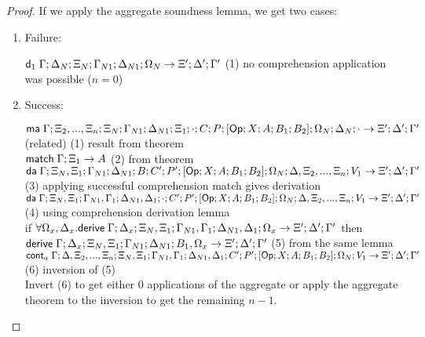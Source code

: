 \begin{proof}
   If we apply the aggregate soundness lemma, we get two cases:
   
   \begin{enumerate}
      \item Failure:
      
      $\mathsf{d}_1 \; \Gamma; \Delta_N; \Xi_N; \Gamma_{N1}; \Delta_{N1}; \Omega_N \rightarrow \Xi'; \Delta'; \Gamma'$ \hfill (1) no comprehension application was possible ($n = 0$)\\
      
      \item Success:
      
      $\mathsf{ma} \; \Gamma; \Xi_2, ..., \Xi_n; \Xi_N; \Gamma_{N1}; \Delta_{N1}; \Xi_1; \cdot; C; P; [\mathsf{Op} ; X ; A ; B_1; B_2]; \Omega_N; \Delta_N; \cdot \rightarrow \Xi'; \Delta'; \Gamma'$ (related) \hfill (1) result from theorem \\
      $\mathsf{match} \; \Gamma; \Xi_1 \rightarrow A$ \hfill (2) from theorem \\
      $\mathsf{da} \; \Gamma; \Xi_N, \Xi_1; \Gamma_{N1}; \Delta_{N1}; B; C'; P'; [\mathsf{Op} ; X ; A ; B_1; B_2]; \Omega_N; \Delta, \Xi_2, ..., \Xi_n; V_1 \rightarrow \Xi'; \Delta'; \Gamma'$ \hfill (3) applying successful comprehension match gives derivation \\
      $\mathsf{da} \; \Gamma; \Xi_N, \Xi_1; \Gamma_{N1}, \Gamma_1; \Delta_{N1}, \Delta_1; \cdot; C'; P'; [\mathsf{Op} ; X ; A ; B_1; B_2]; \Omega_N; \Delta, \Xi_2, ..., \Xi_n; V_1 \rightarrow \Xi'; \Delta'; \Gamma'$ \hfill (4) using comprehension derivation lemma \\
      if $\forall \Omega_x, \Delta_x. \mathsf{derive} \; \Gamma; \Delta_x; \Xi_N, \Xi_1; \Gamma_{N1}, \Gamma_1; \Delta_{N1}, \Delta_1; \Omega_x \rightarrow \Xi'; \Delta'; \Gamma'$ then $\mathsf{derive} \; \Gamma; \Delta_x; \Xi_N, \Xi_1; \Gamma_{N1}; \Delta_{N1}; B_1, \Omega_x \rightarrow \Xi'; \Delta'; \Gamma'$ \hfill (5) from the same lemma \\
      $\mathsf{cont}_a \; \Gamma; \Delta, \Xi_2, ..., \Xi_n; \Xi_N, \Xi_1; \Gamma_{N1}, \Gamma_1; \Delta_{N1}, \Delta_1; C'; P'; [\mathsf{Op} ; X ; A ; B_1; B_2]; \Omega_N; V_1 \rightarrow \Xi'; \Delta'; \Gamma'$ \hfill (6) inversion of (5) \\
      
      Invert (6) to get either $0$ applications of the aggregate or apply the aggregate theorem to the inversion to get the remaining $n-1$. 
   \end{enumerate}
\end{proof}


